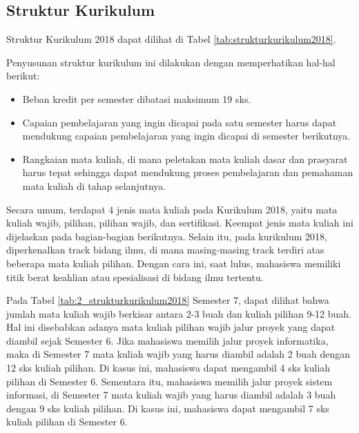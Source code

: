 \subsection{Struktur Kurikulum}

Struktur Kurikulum 2018 dapat dilihat di Tabel \ref{tab:strukturkurikulum2018}.

Penyusunan struktur kurikulum ini dilakukan dengan memperhatikan hal-hal berikut:
\begin{itemize}
	\item Beban kredit per semester dibatasi maksimum 19 sks.
	\item Capaian pembelajaran yang ingin dicapai pada satu semester harus dapat mendukung capaian pembelajaran yang ingin dicapai di semester berikutnya.
	\item Rangkaian mata kuliah, di mana peletakan mata kuliah dasar dan prasyarat harus tepat sehingga dapat mendukung proses pembelajaran dan pemahaman mata kuliah di tahap selanjutnya. 
\end{itemize}
Secara umum, terdapat 4 jenis mata kuliah pada Kurikulum 2018, yaitu mata kuliah wajib, pilihan, pilihan wajib, dan sertifikasi. Keempat jenis mata kuliah ini dijelaskan pada bagian-bagian berikutnya. Selain itu, pada kurikulum 2018, diperkenalkan track bidang ilmu, di mana masing-masing track terdiri atas beberapa mata kuliah pilihan. Dengan cara ini, saat lulus, mahasiswa memiliki titik berat keahlian atau spesialisasi di bidang ilmu tertentu.

Pada Tabel \ref{tab:2_strukturkurikulum2018} Semester 7, dapat dilihat bahwa jumlah mata kuliah wajib berkisar antara 2-3 buah dan kuliah pilihan 9-12 buah. Hal ini disebabkan adanya mata kuliah pilihan wajib jalur proyek yang dapat diambil sejak Semester 6. Jika mahasiswa memilih jalur proyek informatika, maka di Semester 7 mata kuliah wajib yang harus diambil adalah 2 buah dengan 12 sks kuliah pilihan. Di kasus ini, mahasiswa dapat mengambil 4 sks kuliah pilihan di Semester 6. Sementara itu, mahasiswa memilih jalur proyek sistem informasi, di Semester 7 mata kuliah wajib yang harus diambil adalah 3 buah dengan 9 sks kuliah pilihan. Di kasus ini, mahasiswa dapat mengambil 7 sks kuliah pilihan di Semester 6.

